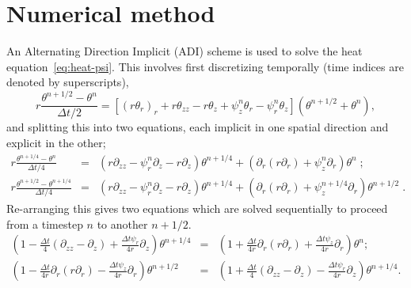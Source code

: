 \documentclass[11pt,twocolumn]{article}
\begin{document}
\begin{appendices}

\label{appendix}


  \section{Numerical method}
\label{app:numerical-method}
An Alternating Direction Implicit (ADI) scheme is used to solve the heat equation~\eqref{eq:heat-psi}. This involves first discretizing temporally (time indices are denoted by superscripts),
\begin{equation}
r  \frac{\theta^{n+1/2} - \theta^n}{\Delta t / 2} = \left[ (r \theta_r)_r + r \theta_{zz} - r \theta_z + \psi^n_z \theta_r - \psi^n_r \theta_z \right] \left( \theta^{n+1/2} + \theta^n \right),
\end{equation}
and splitting this into two equations, each implicit in one spatial direction and explicit in the other;
\begin{eqnarray}
r \frac{\theta^{n+1/4} - \theta^n}{\Delta t / 4} &=& \left(  r \partial_{zz} -  \psi_r^n \partial_z - r \partial_z   \right) \theta^{n+1/4} + \left(  \partial_r (r \partial_r) +   \psi_z^n \partial_r    \right) \theta^{n} \; ;  \\
r \frac{\theta^{n+1/2} - \theta^{n+1/4}}{\Delta t / 4} &=&\left(  r \partial_{zz} -  \psi_r^n \partial_z - r \partial_z   \right) \theta^{n+1/4}   +   \left(  \partial_r (r \partial_r) +   \psi_z^{n+1/4} \partial_r    \right) \theta^{n+1/2}  \;   .   
\end{eqnarray}
Re-arranging this gives two equations which are solved sequentially to proceed from a timestep $n$ to another $n+1/2$.
\begin{eqnarray}
\left( 1 - \frac{\Delta t}{4} (\partial_{zz}-\partial_z) + \frac{\Delta t \psi_r}{4 r} \partial_z \right) \theta^{n+1/4} &=& \left(1 + \frac{\Delta t}{4 r} \partial_r (r \partial_r) + \frac{\Delta t \psi_z}{4 r} \partial_r \right) \theta^n  ; \label{eq:theta-ADI1}\\
\left(1 - \frac{\Delta t}{4 r} \partial_r (r \partial_r) - \frac{\Delta t \psi_z}{4 r} \partial_r \right) \theta^{n+1/2} &=& \left( 1 + \frac{\Delta t}{4} (\partial_{zz}-\partial_z) - \frac{\Delta t \psi_r}{4 r} \partial_z \right) \theta^{n+1/4}  .  \label{eq:theta-ADI2}

\end{eqnarray}
\end{appendices}
\end{document}
